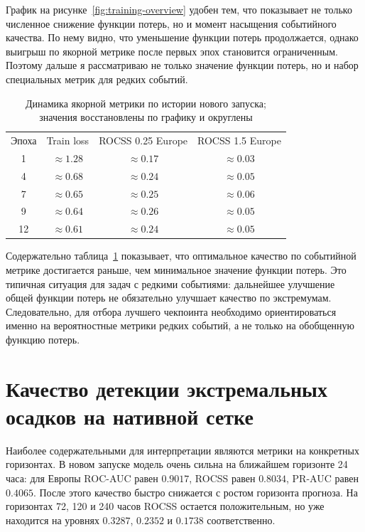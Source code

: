 График на рисунке~\ref{fig:training-overview} удобен тем, что показывает не только численное снижение функции потерь, но и момент насыщения событийного качества. По нему видно, что уменьшение функции потерь продолжается, однако выигрыш по якорной метрике после первых эпох становится ограниченным. Поэтому дальше я рассматриваю не только значение функции потерь, но и набор специальных метрик для редких событий.

\begin{table}[H]
\centering
\begin{tabular}{cccc}
Эпоха & Train loss & ROCSS 0.25 Europe & ROCSS 1.5 Europe \\
1 & \(\approx 1.28\) & \(\approx 0.17\) & \(\approx 0.03\) \\
4 & \(\approx 0.68\) & \(\approx 0.24\) & \(\approx 0.05\) \\
7 & \(\approx 0.65\) & \(\approx 0.25\) & \(\approx 0.06\) \\
9 & \(\approx 0.64\) & \(\approx 0.26\) & \(\approx 0.05\) \\
12 & \(\approx 0.61\) & \(\approx 0.24\) & \(\approx 0.05\) \\
\end{tabular}
\caption{Динамика якорной метрики по истории нового запуска; значения восстановлены по графику и округлены}
\label{tab:anchor-rocss}
\end{table}

Содержательно таблица~\ref{tab:anchor-rocss} показывает, что оптимальное качество по событийной метрике достигается раньше, чем минимальное значение функции потерь. Это типичная ситуация для задач с редкими событиями: дальнейшее улучшение общей функции потерь не обязательно улучшает качество по экстремумам. Следовательно, для отбора лучшего чекпоинта необходимо ориентироваться именно на вероятностные метрики редких событий, а не только на обобщенную функцию потерь.

\section{Качество детекции экстремальных осадков на нативной сетке}

Наиболее содержательными для интерпретации являются метрики на конкретных горизонтах. В новом запуске модель очень сильна на ближайшем горизонте 24 часа: для Европы ROC-AUC равен \(0.9017\), ROCSS равен \(0.8034\), PR-AUC равен \(0.4065\). После этого качество быстро снижается с ростом горизонта прогноза. На горизонтах 72, 120 и 240 часов ROCSS остается положительным, но уже находится на уровнях \(0.3287\), \(0.2352\) и \(0.1738\) соответственно.

